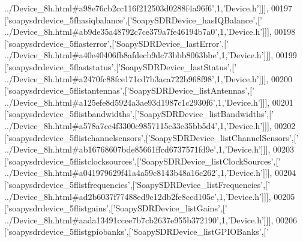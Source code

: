 \begin{DoxyCode}
{      ../Device\_8h.html#a98e76cb2cc116f212503d0288f4a96f6'},1,\textcolor{stringliteral}{'Device.h'}]]],
00197   [\textcolor{stringliteral}{'soapysdrdevice\_5fhasiqbalance'},[\textcolor{stringliteral}{'SoapySDRDevice\_hasIQBalance'},[\textcolor{stringliteral}{'
      ../Device\_8h.html#ab9de35a48792c7ce379a7fe46194b7a0'},1,\textcolor{stringliteral}{'Device.h'}]]],
00198   [\textcolor{stringliteral}{'soapysdrdevice\_5flasterror'},[\textcolor{stringliteral}{'SoapySDRDevice\_lastError'},[\textcolor{stringliteral}{'
      ../Device\_8h.html#a40e40406fb8afdecb9dc73bbb8063bbe'},1,\textcolor{stringliteral}{'Device.h'}]]],
00199   [\textcolor{stringliteral}{'soapysdrdevice\_5flaststatus'},[\textcolor{stringliteral}{'SoapySDRDevice\_lastStatus'},[\textcolor{stringliteral}{'
      ../Device\_8h.html#a2470fc88fce171cd7b3aca722b968f98'},1,\textcolor{stringliteral}{'Device.h'}]]],
00200   [\textcolor{stringliteral}{'soapysdrdevice\_5flistantennas'},[\textcolor{stringliteral}{'SoapySDRDevice\_listAntennas'},[\textcolor{stringliteral}{'
      ../Device\_8h.html#a125efe8d5924a3ae93d1987c1c2930f6'},1,\textcolor{stringliteral}{'Device.h'}]]],
00201   [\textcolor{stringliteral}{'soapysdrdevice\_5flistbandwidths'},[\textcolor{stringliteral}{'SoapySDRDevice\_listBandwidths'},[\textcolor{stringliteral}{'
      ../Device\_8h.html#a578a7cc4f3300c9857115c33e35bb5d4'},1,\textcolor{stringliteral}{'Device.h'}]]],
00202   [\textcolor{stringliteral}{'soapysdrdevice\_5flistchannelsensors'},[\textcolor{stringliteral}{'SoapySDRDevice\_listChannelSensors'},[\textcolor{stringliteral}{'
      ../Device\_8h.html#ab16768607bde85661ffcd6737571fd9e'},1,\textcolor{stringliteral}{'Device.h'}]]],
00203   [\textcolor{stringliteral}{'soapysdrdevice\_5flistclocksources'},[\textcolor{stringliteral}{'SoapySDRDevice\_listClockSources'},[\textcolor{stringliteral}{'
      ../Device\_8h.html#a041979629f41a4a59c8143b48a16c262'},1,\textcolor{stringliteral}{'Device.h'}]]],
00204   [\textcolor{stringliteral}{'soapysdrdevice\_5flistfrequencies'},[\textcolor{stringliteral}{'SoapySDRDevice\_listFrequencies'},[\textcolor{stringliteral}{'
      ../Device\_8h.html#ad2b6037f77488ed9c12db2fe8ccd105e'},1,\textcolor{stringliteral}{'Device.h'}]]],
00205   [\textcolor{stringliteral}{'soapysdrdevice\_5flistgains'},[\textcolor{stringliteral}{'SoapySDRDevice\_listGains'},[\textcolor{stringliteral}{'
      ../Device\_8h.html#aada13491ccee7b7cb2637e955b372190'},1,\textcolor{stringliteral}{'Device.h'}]]],
00206   [\textcolor{stringliteral}{'soapysdrdevice\_5flistgpiobanks'},[\textcolor{stringliteral}{'SoapySDRDevice\_listGPIOBanks'},[\textcolor{stringliteral}{'
}
\end{DoxyCode}
